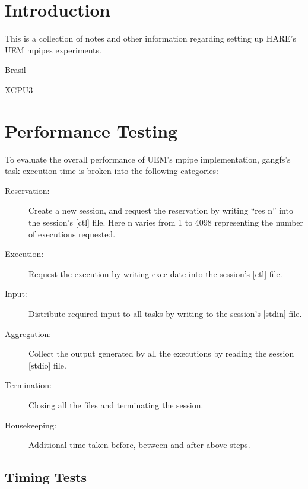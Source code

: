 \documentclass{article}
\begin{document}
\maketitle

\section*{Introduction}
This is a collection of notes and other information regarding setting
up HARE's UEM mpipes experiments.

Brasil~\cite{Brasil:2011:BBR}

XCPU3~\cite{Pravin:2010:XWD}

\section*{Performance Testing}

To evaluate the overall performance of UEM's mpipe implementation,
gangfs's task execution time is broken into the following categories:

\begin{description}
  \item [Reservation:] Create a new session, and request the
    reservation by writing ``res n'' into the session's [ctl] file.
    Here n varies from 1 to 4098 representing the number of executions
    requested.
  \item [Execution:] Request the execution by writing exec date into
    the session's [ctl] file.
  \item [Input:] Distribute required input to all tasks by writing to
    the session's [stdin] file.
  \item [Aggregation:] Collect the output generated by all the
    executions by reading the session [stdio] file.
  \item [Termination:] Closing all the files and terminating the
    session.
  \item [Housekeeping:] Additional time taken before, between and
    after above steps.
\end{description}

\subsection*{Timing Tests}
\end{document}
